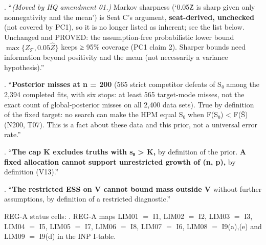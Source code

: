 \begin{description}[style=nextline,leftmargin=1.2cm]
\item[\defid{LIM06}] . ``\emph{(Moved by HQ amendment 01.)} Markov sharpness (`0.05Ẑ is sharp given only nonnegativity and the mean') is Seat C's argument, \textbf{seat-derived, unchecked} (not covered by PC1), so it is no longer listed as inherent; see the list below. Unchanged and PROVED: the assumption-free probabilistic lower bound $\max\{Z_{𝒯}, 0.05\hat{Z}\}$ keeps ≥ 95\% coverage (PC1 claim 2). Sharper bounds need information beyond positivity and the mean (not necessarily a variance hypothesis).'' 
\item[\defid{LIM07}] . ``\textbf{Posterior misses at n = 200} (565 strict competitor defeats of S₀ among the 2,394 completed fits, with six stops: at least 565 target-mode misses, not the exact count of global-posterior misses on all 2,400 data sets). True by definition of the fixed target: no search can make the HPM equal S₀ when F(S₀) < F(Ŝ) (N200, T07). This is a fact about these data and this prior, not a universal error rate.'' 
\item[\defid{LIM08}] . ``\textbf{The cap K excludes truths with s₀ > K,} by definition of the prior. \textbf{A fixed allocation cannot support unrestricted growth of (n, p),} by definition (V13).'' 
\item[\defid{LIM09}] . ``\textbf{The restricted ESS on V cannot bound mass outside V} without further assumptions, by definition of a restricted diagnostic.'' 
\end{description}
REG-A status cells: . REG-A maps LIM01 $=$ I1, LIM02 $=$ I2, LIM03 $=$ I3, LIM04 $=$ I5, LIM05 $=$ I7, LIM06 $=$ I8, LIM07 $=$ I6, LIM08 $=$ I9(a),(e) and LIM09 $=$ I9(d) in the INP I-table.

